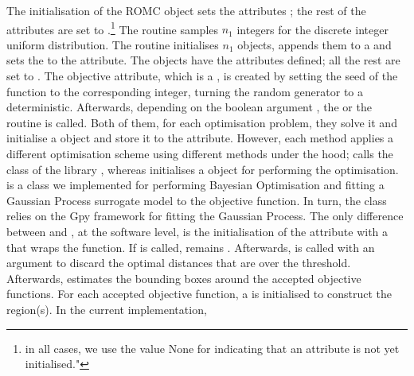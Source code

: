The initialisation of the ROMC object sets the attributes
; the rest of the
attributes are set to .\footnote{in all cases, we use
  the value None for indicating that an attribute is not yet
  initialised."} The  routine samples
$n_1$ integers for the discrete integer uniform distribution. The
 routine initialises $n_1$
 objects, appends them to a
 and sets the  to the
 attribute. The
 objects have the attributes
 defined; all the rest are set to
. The objective attribute, which is a
, is created by setting the seed of the
 function to the corresponding integer,
turning the random generator to a deterministic. Afterwards, depending
on the boolean argument , the
 or the  routine is
called. Both of them, for each optimisation problem, they solve it and
initialise a  object and store it to
the  attribute. However, each
method applies a different optimisation scheme using different methods
under the hood;  calls the
 class of the  library
\autocite{2020SciPy-NMeth}, whereas  initialises a
 object for performing the
optimisation. is a class we implemented for
performing Bayesian Optimisation and fitting a Gaussian Process
surrogate model to the objective function. In turn, the
 class relies on the Gpy framework
\autocite{gpy2014} for fitting the Gaussian Process. The only
difference between  and ,
at the software level, is the initialisation of the
 attribute with a
 that wraps the 
function. If  is called, remains
. Afterwards,  is called with
an argument  to discard the optimal distances that
are over the threshold. Afterwards,  estimates
the bounding boxes around the accepted objective functions. For each
accepted objective function, a  is
initialised to construct the region(s). In the current implementation,
